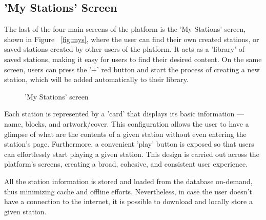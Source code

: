 \newpage
\subsection{'My Stations' Screen}

The last of the four main screens of the platform is the 'My Stations' screen, shown in Figure ~\ref{fig:mys}, where the user can find their own created stations, or saved stations created by other users of the platform. It acts as a 'library' of saved stations, making it easy for users to find their desired content. On the same screen, users can press the '+' red button and start the process of creating a new station, which will be added automatically to their library.

\begin{figure}[h]
\centering
{}
\caption{'My Stations' screen}
\label{fig:mysss}
\end{figure}

Each station is represented by a 'card' that displays its basic information — name, blocks, and artwork/cover. This configuration allows the user to have a glimpse of what are the contents of a given station without even entering the station's page. Furthermore, a convenient 'play' button is exposed so that users can effortlessly start playing a given station. This design is carried out across the platform's screens, creating a broad, cohesive, and consistent user experience.

All the station information is stored and loaded from the database on-demand, thus minimizing cache and offline efforts. Nevertheless, in case the user doesn't have a connection to the internet, it is possible to download and locally store a given station.


